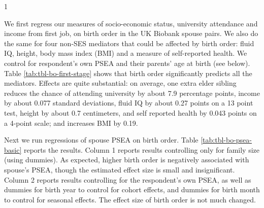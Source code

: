\documentclass[
  12pt,
]{article}
\theoremstyle{definition}
\theoremstyle{definition}
\theoremstyle{definition}
\theoremstyle{definition}
\theoremstyle{remark}
\begin{document}
\begin{table}[ht]
\begin{centerbox}
\begin{threeparttable}
\begin{tabularx}{1\textwidth}
 \tabularnewline[-0.5pt]


\hhline{}
\end{tabularx}
\end{threeparttable}\par\end{centerbox}

\end{table}
 

We first regress our measures of socio-economic status, university
attendance and income from first job, on birth order in the UK Biobank
spouse pairs. We also do the same for four non-SES mediators that could
be affected by birth order: fluid IQ, height, body mass index (BMI) and
a measure of self-reported health. We control for respondent's own PSEA
and their parents' age at birth (see below). Table
\ref{tab:tbl-bo-first-stage} shows that birth order significantly
predicts all the mediators. Effects are quite substantial: on average,
one extra elder sibling reduces the chance of attending university by
about 7.9 percentage points, income
by about 0.077 standard deviations, fluid IQ by
about 0.27 points on a 13 point test, height
by about 0.7 centimeters, and self reported
health by 0.043 points on a 4-point scale; and
increases BMI by 0.19.

Next we run regressions of spouse PSEA on birth order. Table
\ref{tab:tbl-bo-psea-basic} reports the results. Column 1 reports
results controlling only for family size (using dummies). As expected,
higher birth order is negatively associated with spouse's PSEA, though
the estimated effect size is small and insignificant. Column 2 reports
results controlling for the respondent's own PSEA, as well as dummies
for birth year to control for cohort effects, and dummies for birth
month to control for seasonal effects. The effect size of birth order is
not much changed.
\end{document}
